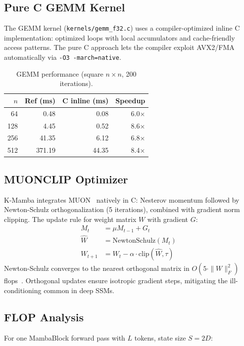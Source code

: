 \documentclass[10pt,onecolumn]{article}
\begin{document}
\subsection{Pure C GEMM Kernel}

The GEMM kernel (\texttt{kernels/gemm\_f32.c}) uses a compiler-optimized
inline C implementation: optimized loops with local accumulators
and cache-friendly access patterns. The pure C approach lets the compiler
exploit AVX2/FMA automatically via \texttt{-O3 -march=native}.

\begin{table}[htbp]
\centering
\caption{GEMM performance (square $n \times n$, 200 iterations).}
\label{tab:gemm}
\begin{tabular}{rrrr}
\toprule
$n$ & Ref (ms) & C inline (ms) & Speedup \\
\midrule
 64 & 0.48 & 0.08 & 6.0× \\
128 & 4.45 & 0.52 & 8.6× \\
256 & 41.35 & 6.12 & 6.8× \\
512 & 371.19 & 44.35 & 8.4× \\
\bottomrule
\end{tabular}
\end{table}

\subsection{MUONCLIP Optimizer}

K-Mamba integrates MUON~\cite{muon2025} natively in C:
Nesterov momentum followed by Newton-Schulz orthogonalization
(5 iterations), combined with gradient norm clipping.
The update rule for weight matrix $W$ with gradient $G$:
\begin{align}
  M_t &= \mu M_{t-1} + G_t \\
  \hat{W} &= \text{NewtonSchulz}(M_t) \\
  W_{t+1} &= W_t - \alpha \cdot \text{clip}(\hat{W}, \tau)
\end{align}
Newton-Schulz converges to the nearest orthogonal matrix in
$O(5 \cdot \|W\|_F^2)$ flops~\cite{bjorck1971}.
Orthogonal updates ensure isotropic gradient steps,
mitigating the ill-conditioning common in deep SSMs.

\subsection{FLOP Analysis}

For one MambaBlock forward pass with $L$ tokens, state size $S = 2D$:
\end{document}
